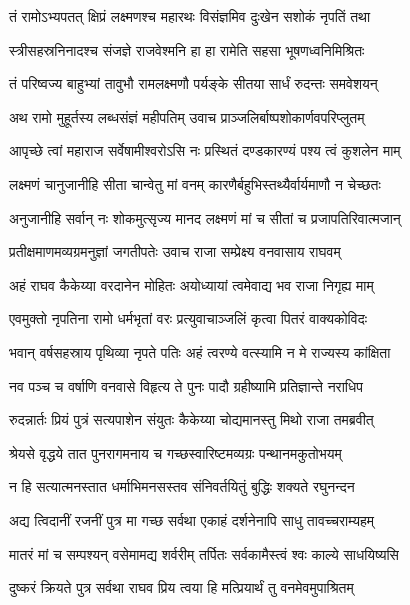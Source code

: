 \twolineshloka
{तं रामोऽभ्यपतत् क्षिप्रं लक्ष्मणश्च महारथः}
{विसंज्ञमिव दुःखेन सशोकं नृपतिं तथा} %

\twolineshloka
{स्त्रीसहस्रनिनादश्च संजज्ञे राजवेश्मनि}
{हा हा रामेति सहसा भूषणध्वनिमिश्रितः} %

\twolineshloka
{तं परिष्वज्य बाहुभ्यां तावुभौ रामलक्ष्मणौ}
{पर्यङ्के सीतया सार्धं रुदन्तः समवेशयन्} %

\twolineshloka
{अथ रामो मुहूर्तस्य लब्धसंज्ञं महीपतिम्}
{उवाच प्राञ्जलिर्बाष्पशोकार्णवपरिप्लुतम्} %

\twolineshloka
{आपृच्छे त्वां महाराज सर्वेषामीश्वरोऽसि नः}
{प्रस्थितं दण्डकारण्यं पश्य त्वं कुशलेन माम्} %

\twolineshloka
{लक्ष्मणं चानुजानीहि सीता चान्वेतु मां वनम्}
{कारणैर्बहुभिस्तथ्यैर्वार्यमाणौ न चेच्छतः} %

\twolineshloka
{अनुजानीहि सर्वान् नः शोकमुत्सृज्य मानद}
{लक्ष्मणं मां च सीतां च प्रजापतिरिवात्मजान्} %

\twolineshloka
{प्रतीक्षमाणमव्यग्रमनुज्ञां जगतीपतेः}
{उवाच राजा सम्प्रेक्ष्य वनवासाय राघवम्} %

\twolineshloka
{अहं राघव कैकेय्या वरदानेन मोहितः}
{अयोध्यायां त्वमेवाद्य भव राजा निगृह्य माम्} %

\twolineshloka
{एवमुक्तो नृपतिना रामो धर्मभृतां वरः}
{प्रत्युवाचाञ्जलिं कृत्वा पितरं वाक्यकोविदः} %

\twolineshloka
{भवान् वर्षसहस्राय पृथिव्या नृपते पतिः}
{अहं त्वरण्ये वत्स्यामि न मे राज्यस्य कांक्षिता} %

\twolineshloka
{नव पञ्च च वर्षाणि वनवासे विहृत्य ते}
{पुनः पादौ ग्रहीष्यामि प्रतिज्ञान्ते नराधिप} %

\twolineshloka
{रुदन्नार्तः प्रियं पुत्रं सत्यपाशेन संयुतः}
{कैकेय्या चोद्यमानस्तु मिथो राजा तमब्रवीत्} %

\twolineshloka
{श्रेयसे वृद्धये तात पुनरागमनाय च}
{गच्छस्वारिष्टमव्यग्रः पन्थानमकुतोभयम्} %

\twolineshloka
{न हि सत्यात्मनस्तात धर्माभिमनसस्तव}
{संनिवर्तयितुं बुद्धिः शक्यते रघुनन्दन} %

\twolineshloka
{अद्य त्विदानीं रजनीं पुत्र मा गच्छ सर्वथा}
{एकाहं दर्शनेनापि साधु तावच्चराम्यहम्} %

\twolineshloka
{मातरं मां च सम्पश्यन् वसेमामद्य शर्वरीम्}
{तर्पितः सर्वकामैस्त्वं श्वः काल्ये साधयिष्यसि} %

\twolineshloka
{दुष्करं क्रियते पुत्र सर्वथा राघव प्रिय}
{त्वया हि मत्प्रियार्थं तु वनमेवमुपाश्रितम्} %

